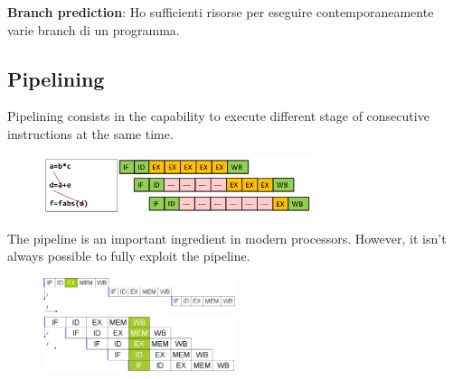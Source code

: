 \textbf{Branch prediction}:
Ho sufficienti risorse per eseguire contemporaneamente varie branch di un programma.

\subsection{Pipelining}


Pipelining consists in the capability to execute different stage of consecutive instructions at the same time.

\begin{figure}[ht]
    \centering
    \includegraphics[width=0.7\textwidth]{figure_parallel/pipeline.png}
\end{figure}
\FloatBarrier

The pipeline is an important ingredient in
modern processors. However, it isn’t always possible to fully exploit the pipeline.

\begin{figure}[ht]
    \centering
    \includegraphics[width=0.5\textwidth]{figure_parallel/pipeline1.png}
    \includegraphics[width=0.5\textwidth]{figure_parallel/pipeline2.png}\end{figure}
\FloatBarrier



